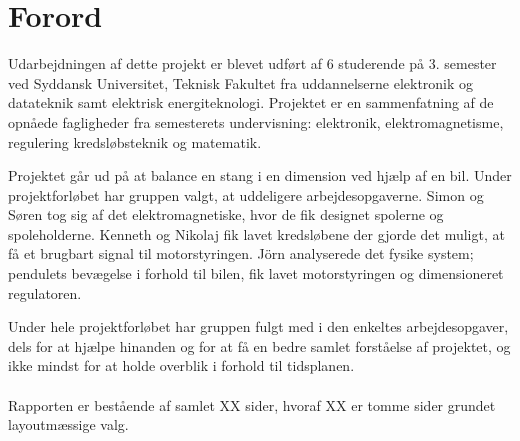 \section{Forord}\label{sec:forord}
Udarbejdningen af dette projekt er blevet udført af 6 studerende på 3. semester ved Syddansk Universitet, Teknisk Fakultet fra uddannelserne elektronik og datateknik samt elektrisk energiteknologi.
Projektet er en sammenfatning af de opnåede fagligheder fra semesterets undervisning: elektronik, elektromagnetisme, regulering kredsløbsteknik og matematik.

Projektet går ud på at balance en stang i en dimension ved hjælp af en bil. Under projektforløbet har gruppen valgt, at uddeligere arbejdesopgaverne. Simon og Søren tog sig af det elektromagnetiske, hvor de fik designet spolerne og spoleholderne. Kenneth og Nikolaj fik lavet kredsløbene der gjorde det muligt, at få et brugbart signal til motorstyringen. Jörn analyserede det fysike system; pendulets bevægelse i forhold til bilen, fik lavet motorstyringen og dimensioneret regulatoren.

Under hele projektforløbet har gruppen fulgt med i den enkeltes arbejdesopgaver, dels for at hjælpe hinanden og for at få en bedre samlet forståelse af projektet, og ikke mindst for at holde overblik i forhold til tidsplanen. 
\\ \\
Rapporten er bestående af samlet XX sider, hvoraf XX er tomme sider grundet layoutmæssige valg. 